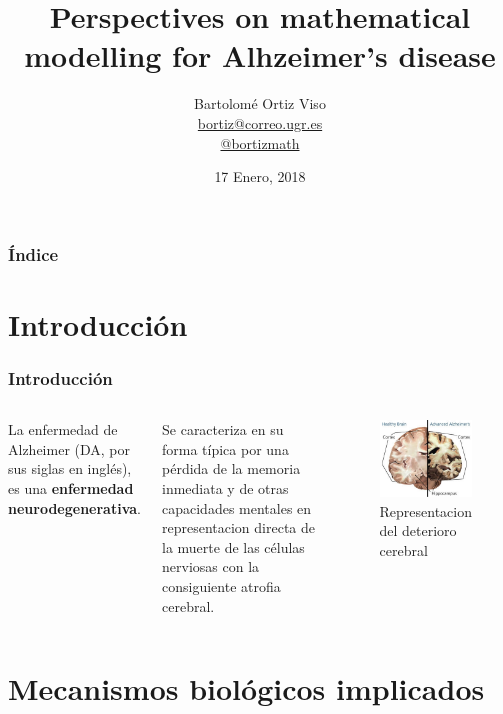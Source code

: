 \documentclass{beamer}
\title[Mathematical model on Alzheimer's disease]{
  Perspectives on mathematical modelling for Alhzeimer's disease}
\subtitle{}
\author[Bartolomé Ortiz Viso]{
  Bartolomé Ortiz Viso \\\medskip
  {\small \url{bortiz@correo.ugr.es}} \\ 
  {\small \url{@bortizmath}}}
\institute[Universidad de Granada]{
  Dinámica celular y tumoral  \\
  Máster en Física y Matemáticas}
\date[17 Enero, 2018]{
  17 Enero, 2018}
\begin{document}
\begin{frame}
  \titlepage
\end{frame}

\begin{frame}
  \frametitle{Índice}

  \tableofcontents
\end{frame}

\section{Introducción}

\begin{frame}
  \frametitle{Introducción}
\begin{columns}[t]
	La enfermedad de Alzheimer (DA, por sus siglas en inglés), es una \textbf{enfermedad neurodegenerativa}.
	
	 Se caracteriza en su forma típica por una pérdida de la memoria inmediata y de otras capacidades mentales en representacion directa de la muerte de las células nerviosas con la consiguiente atrofia cerebral.
	
	\begin{figure}[Atrofia cerebral]
		\includegraphics[scale=0.46]{alzheimer-cerebro-imagen.jpg}
		\caption{Representacion del deterioro cerebral}
		\label{cerebro}
	\end{figure}
\end{columns}
\end{frame}

\section{Mecanismos biológicos implicados}
\end{document}

